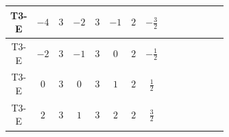 \documentclass[8pt]{article}
\begin{document}
\begin{landscape}
\begin{longtable}{@{}cccccccc >{\raggedright\arraybackslash}p{0.21\linewidth} >{\raggedright\arraybackslash}p{0.21\linewidth} >{\raggedright\arraybackslash}p{0.21\linewidth}@{}}
\midrule
T3-E & $-4$ & $3$ & $-2$ & $3$ & $-1$ & $2$ & $-\frac{3}{2}$ & \scriptsize\adjustbox{max width=\linewidth}{$\begin{gathered} +D_{\mu _1}\left(S_{2,j_1}\right){}^{\dagger } D_{\mu _1}\left(S_{2,j_1}\right)\end{gathered}$} & \scriptsize\adjustbox{max width=\linewidth}{$\begin{gathered} -\frac{9 \hbar  B_{\mu _1\mu _2}^2}{2 \epsilon }\end{gathered}$} & \scriptsize\adjustbox{max width=\linewidth}{$\begin{gathered} -\frac{\hbar  \left(W_{\mu _1\mu _2}^{A_1}\right){}^2}{2 \epsilon }\end{gathered}$} \\
\midrule
T3-E & $-2$ & $3$ & $-1$ & $3$ & $0$ & $2$ & $-\frac{1}{2}$ & \scriptsize\adjustbox{max width=\linewidth}{$\begin{gathered} +D_{\mu _1}\left(S_{2,j_1}\right){}^{\dagger } D_{\mu _1}\left(S_{2,j_1}\right)\end{gathered}$} & \scriptsize\adjustbox{max width=\linewidth}{$\begin{gathered} -\frac{\hbar  B_{\mu _1\mu _2}^2}{2 \epsilon }\end{gathered}$} & \scriptsize\adjustbox{max width=\linewidth}{$\begin{gathered} -\frac{\hbar  \left(W_{\mu _1\mu _2}^{A_1}\right){}^2}{2 \epsilon }\end{gathered}$} \\
\midrule
T3-E & $0$ & $3$ & $0$ & $3$ & $1$ & $2$ & $\frac{1}{2}$ & \scriptsize\adjustbox{max width=\linewidth}{$\begin{gathered} +D_{\mu _1}\left(S_{2,j_1}\right){}^{\dagger } D_{\mu _1}\left(S_{2,j_1}\right)\end{gathered}$} & \scriptsize\adjustbox{max width=\linewidth}{$\begin{gathered} -\frac{\hbar  B_{\mu _1\mu _2}^2}{2 \epsilon }\end{gathered}$} & \scriptsize\adjustbox{max width=\linewidth}{$\begin{gathered} -\frac{\hbar  \left(W_{\mu _1\mu _2}^{A_1}\right){}^2}{2 \epsilon }\end{gathered}$} \\
\midrule
T3-E & $2$ & $3$ & $1$ & $3$ & $2$ & $2$ & $\frac{3}{2}$ & \scriptsize\adjustbox{max width=\linewidth}{$\begin{gathered} +D_{\mu _1}\left(S_{2,j_1}\right){}^{\dagger } D_{\mu _1}\left(S_{2,j_1}\right)\end{gathered}$} & \scriptsize\adjustbox{max width=\linewidth}{$\begin{gathered} -\frac{9 \hbar  B_{\mu _1\mu _2}^2}{2 \epsilon }\end{gathered}$} & \scriptsize\adjustbox{max width=\linewidth}{$\begin{gathered} -\frac{\hbar  \left(W_{\mu _1\mu _2}^{A_1}\right){}^2}{2 \epsilon }\end{gathered}$} \\

\end{longtable}
\end{landscape}
\end{document}
